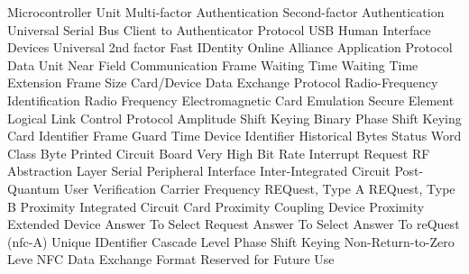      {Microcontroller Unit}
     {Multi-factor Authentication}
     {Second-factor Authentication}
     {Universal Serial Bus}
    {Client to Authenticator Protocol}
	    {USB Human Interface Devices}
     {Universal 2nd factor}
    {Fast IDentity Online Alliance}
    {Application Protocol Data Unit}
     {Near Field Communication}
 	{Frame Waiting Time}
 	{Waiting Time Extension}
	{Frame Size Card/Device}
	    {Data Exchange Protocol}
    {Radio-Frequency Identification}
	    {Radio Frequency}
	    {Electromagnetic}
	    {Card Emulation}
	    {Secure Element}
    {Logical Link Control Protocol}
	    {Amplitude Shift Keying}
    {Binary Phase Shift Keying}
	    {Card Identifier}
	    {Frame Guard Time}
	    {Device Identifier}
	    {Historical Bytes}
	    {Status Word}
	    {Class Byte}
	    {Printed Circuit Board}
	{Very High Bit Rate}
	    {Interrupt Request}
 	{RF Abstraction Layer}
	    {Serial Peripheral Interface}
	    {Inter-Integrated Circuit}
      {Post-Quantum}
      {User Verification}
      {Carrier Frequency}
    {REQuest, Type A}
    {REQuest, Type B}
    {Proximity Integrated Circuit Card}
     {Proximity Coupling Device}
     {Proximity Extended Device}
     {Answer To Select}
    {Request Answer To Select}
    {Answer To reQuest (nfc-A)}
     {Unique IDentifier}
      {Cascade Level}
     {Phase Shift Keying}
   {Non-Return-to-Zero Leve}
    {NFC Data Exchange Format}
     {Reserved for Future Use}